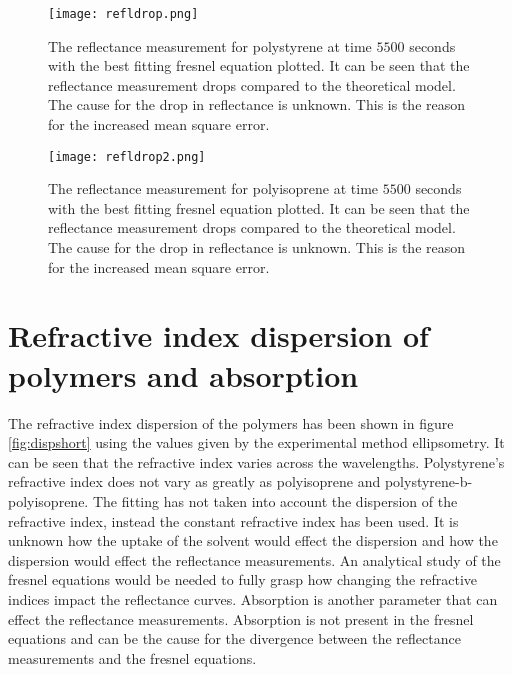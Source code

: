 \documentclass[MasterThesisMain.tex]{subfiles}
\begin{document}
\begin{figure}[H]
\centering
\texttt{[image: refldrop.png]}
\caption{The reflectance measurement for polystyrene at time $5500$ seconds with the best fitting fresnel equation plotted. It can be seen that the reflectance measurement drops compared to the theoretical model. The cause for the drop in reflectance is unknown. This is the reason for the increased mean square error.}
\label{fig:drop}
\end{figure}

\begin{figure}[H]
\centering
\texttt{[image: refldrop2.png]}
\caption{The reflectance measurement for polyisoprene at time $5500$ seconds with the best fitting fresnel equation plotted. It can be seen that the reflectance measurement drops compared to the theoretical model. The cause for the drop in reflectance is unknown. This is the reason for the increased mean square error.}
\label{fig:drop2}
\end{figure}

\section{Refractive index dispersion of polymers and absorption}
The refractive index dispersion of the polymers has been shown in figure \ref{fig:dispshort} using the values given by the experimental method ellipsometry. It can be seen that the refractive index varies across the wavelengths. Polystyrene's refractive index does not vary as greatly as polyisoprene and polystyrene-b-polyisoprene. The fitting has not taken into account the dispersion of the refractive index, instead the constant refractive index has been used. It is unknown how the uptake of the solvent would effect the dispersion and how the dispersion would effect the reflectance measurements. An analytical study of the fresnel equations would be needed to fully grasp how changing the refractive indices impact the reflectance curves. Absorption is another parameter that can effect the reflectance measurements. Absorption is not present in the fresnel equations and can be the cause for the divergence between the reflectance measurements and the fresnel equations. 
\end{document}
